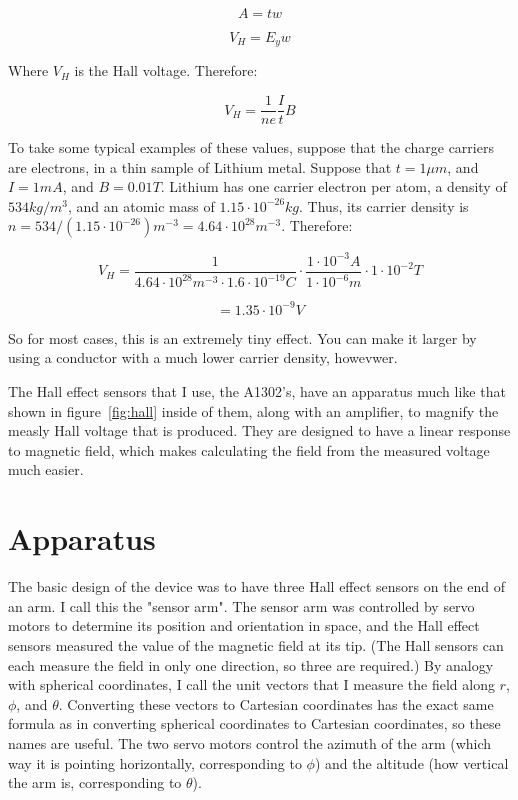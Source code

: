 \documentclass[]{article}
\begin{document}
$$
A = tw
$$

$$
V_H = E_yw
$$

Where $V_H$ is the Hall voltage. Therefore:

$$
V_H = \frac{1}{ne}\frac{I}{t} B
$$

To take some typical examples of these values, suppose that the charge carriers are electrons, in a thin sample of Lithium metal. Suppose that $t = 1 \mu m$, and $I = 1mA$, and $B=0.01T$. Lithium has one carrier electron per atom, a density of $534kg/m^3$, and an atomic mass of $1.15 \cdot 10^{-26}kg$. Thus, its carrier density is $n = 534 / (1.15 \cdot 10^{-26}) m^{-3} = 4.64\cdot 10^{28} m^{-3}$. Therefore:

$$
V_H = \frac{1}{4.64\cdot 10^{28} m^{-3} \cdot 1.6 \cdot 10^{-19} C} \cdot \frac{1\cdot 10^{-3} A}{1\cdot {10^{-6}} m} \cdot 1 \cdot 10^{-2} T
$$

$$
= 1.35\cdot 10^{-9} V
$$

So for most cases, this is an extremely tiny effect. You can make it larger by using a conductor with a much lower carrier density, howevwer.

The Hall effect sensors that I use, the A1302's, have an apparatus much like that shown in figure~\ref{fig:hall} inside of them, along with an amplifier, to magnify the measly Hall voltage that is produced. They are designed to have a linear response to magnetic field, which makes calculating the field from the measured voltage much easier.

\section*{Apparatus}

The basic design of the device was to have three Hall effect sensors on the end of an arm. I call this the "sensor arm". The sensor arm was controlled by servo motors to determine its position and orientation in space, and the Hall effect sensors measured the value of the magnetic field at its tip. (The Hall sensors can each measure the field in only one direction, so three are required.) By analogy with spherical coordinates, I call the unit vectors that I measure the field along $r$, $\phi$, and $\theta$. Converting these vectors to Cartesian coordinates has the exact same formula as in converting spherical coordinates to Cartesian coordinates, so these names are useful. The two servo motors control the azimuth of the arm (which way it is pointing horizontally, corresponding to $\phi$) and the altitude (how vertical the arm is, corresponding to $\theta$).
\end{document}
